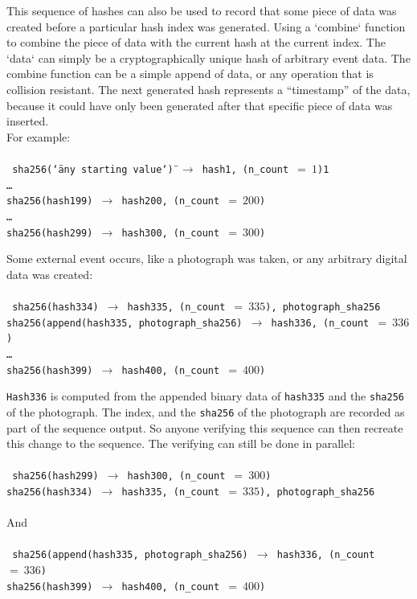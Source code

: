 \documentclass[12pt]{article}
\begin{document}
This sequence of hashes can also be used to record that some piece of data was created before a particular hash index was generated. Using a `combine` function to combine the piece of data with the current hash at the current index. The `data` can simply be a cryptographically unique hash of arbitrary event data. The combine function can be a simple append of data, or any operation that is collision resistant. The next generated hash represents a “timestamp” of the data, because it could have only been generated after that specific piece of data was inserted.\\

\noindent For example:\\\\\noindent
\texttt{
sha256(\char`\"any starting value\char`\") $\rightarrow$ hash1,
(n\_count $=~1$)1\\
\ldots\\
sha256(hash199) $\rightarrow$ hash200, (n\_count $=~200$)\\
\ldots\\
sha256(hash299) $\rightarrow$ hash300, (n\_count $=~300$)\\
}

\noindent Some external event occurs, like a photograph was taken, or
any arbitrary digital data was created:\\\\\noindent
\texttt{
  sha256(hash334) $\rightarrow$ hash335, (n\_count $=~335$), photograph\_sha256\\
  sha256(append(hash335, photograph\_sha256) $\rightarrow$ hash336,
  (n\_count $=~336$)\\
  \ldots\\
  sha256(hash399) $\rightarrow$ hash400, (n\_count $=~400$)\\
}

\texttt{Hash336} is computed from the appended binary data of
\texttt{hash335} and the \texttt{sha256} of the photograph. The index,
and the \texttt{sha256} of the photograph are recorded as part of the
sequence output. So anyone verifying this sequence can then recreate
this change to the sequence. The verifying can still be done in
parallel:\\\\\noindent
\texttt{
  sha256(hash299) $\rightarrow$ hash300, (n\_count $=~300$)\\
  sha256(hash334) $\rightarrow$ hash335, (n\_count $=~335$), photograph\_sha256\\
}\\\noindent
And\\\\\noindent
\texttt{
  sha256(append(hash335, photograph\_sha256) $\rightarrow$ hash336,
  (n\_count $=~336$)\\
  sha256(hash399) $\rightarrow$ hash400, (n\_count $=~400$)\\
}
\end{document}
